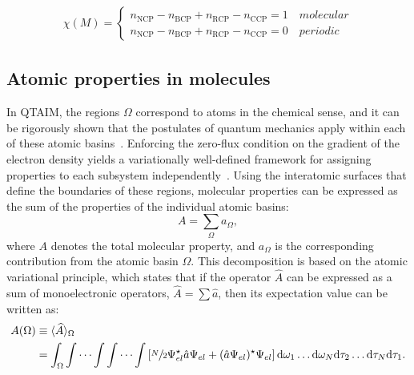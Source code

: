 \begin{align}
  \chi(M) =
  \begin{cases}
    n_{\text{NCP}} - n_{\text{BCP}} + n_{\text{RCP}} - n_{\text{CCP}} = 1 \quad molecular \\
    n_{\text{NCP}} - n_{\text{BCP}} + n_{\text{RCP}} - n_{\text{CCP}} = 0 \quad periodic
  \end{cases}
\end{align}

\newpage
\subsection{Atomic properties in molecules}

In \gls{QTAIM}, the regions $\Omega$ correspond to atoms in the chemical sense,
and it can be rigorously shown that the postulates of quantum mechanics apply
within each of these atomic basins~\cite{bader}. Enforcing the zero-flux
condition on the gradient of the electron density yields a variationally
well-defined framework for assigning properties to each subsystem
independently~\cite{Bieglerknig1982}. Using the interatomic surfaces that
define the boundaries of these regions, molecular properties can be expressed
as the sum of the properties of the individual atomic basins:
%
\begin{equation}
  A = \sum_\Omega a_\Omega,
  \label{promoleculares}
\end{equation}
%
\noindent where $A$ denotes the total molecular property, and $a_{\Omega}$ is
the corresponding contribution from the atomic basin $\Omega$. This
decomposition is based on the atomic variational principle, which states that
if the operator $\hat{A}$ can be expressed as a sum of monoelectronic
operators, $\hat{A} = \sum\hat{a}$, then its expectation value can be written
as:
%
\begin{align}
  A(\Omega) &\equiv \langle\widehat{A}\rangle_\Omega \nonumber \\
    &= \int_\Omega\int\cdots\int\int\cdots\int
  \left [ \sfrac{N}{2}\Psi_{el}^{\star}\hat{a}\Psi_{el} + (\hat{a}\Psi_{el})^{\star}\Psi_{el}\right ]
  \dd\omega_1\ldots \dd\omega_N\dd\tau_2\ldots \dd\tau_N\dd\tau_1 .
\end{align}

